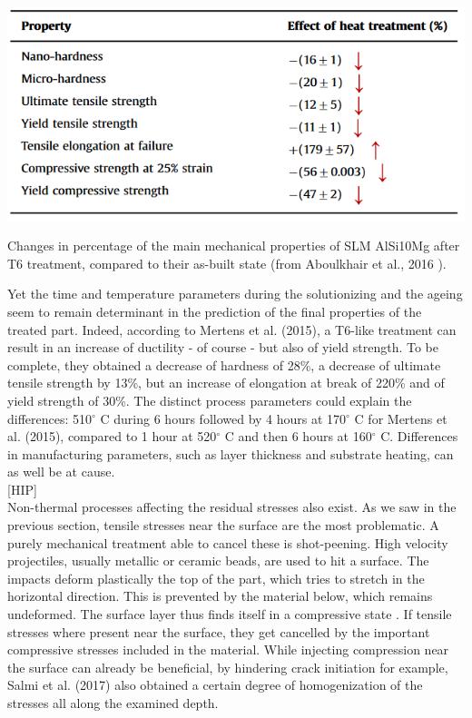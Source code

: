 \begin{table}[ht]
		\centering
			\includegraphics[scale=0.70]{Images/ABvsT6}
			\decoRule
		\caption[Changes in percentage of the main mechanical properties of SLM AlSi10Mg after T6 treatment, , compared to their as-built state] {Changes in percentage of the main mechanical properties of SLM AlSi10Mg after T6 treatment, compared to their as-built state (from Aboulkhair et al., 2016 \parencite{ABOULKHAIR2016139}).}
		\label{tab:ABvsT6}
\end{table}

Yet the time and temperature parameters during the solutionizing and the ageing seem to remain determinant in the prediction of the final properties of the treated part. Indeed, according to Mertens et al. (2015)\cite{Mertens15}, a T6-like treatment can result in an increase of ductility - of course - but also of yield strength. To be complete, they obtained a decrease of hardness of 28\%, a decrease of ultimate tensile strength by 13\%, but an increase of elongation at break of 220\% and of yield strength of 30\%. The distinct process parameters could explain the differences: 510$^\circ$ C during 6 hours followed by 4 hours at 170$^\circ$ C for Mertens et al. (2015)\cite{Mertens15}, compared to 1 hour at 520$^\circ$ C and then 6 hours at 160$^\circ$ C. Differences in manufacturing parameters, such as layer thickness and substrate heating, can as well be at cause.\\

[HIP]\\

Non-thermal processes affecting the residual stresses also exist. As we saw in the previous section, tensile stresses near the surface are the most problematic. A purely mechanical treatment able to cancel these is shot-peening. High velocity projectiles, usually metallic or ceramic beads, are used to hit a surface. The impacts deform plastically the top of the part, which tries to stretch in the horizontal direction. This is prevented by the material below, which remains undeformed. The surface layer thus finds itself in a compressive state \cite{Vrancken2016}. If tensile stresses where present near the surface, they get cancelled by the important compressive stresses included in the material. While injecting compression near the surface can already be beneficial, by hindering crack initiation for example, Salmi et al. (2017) \cite{Salmi2017} also obtained a certain degree of homogenization of the stresses all along the examined depth. \\

